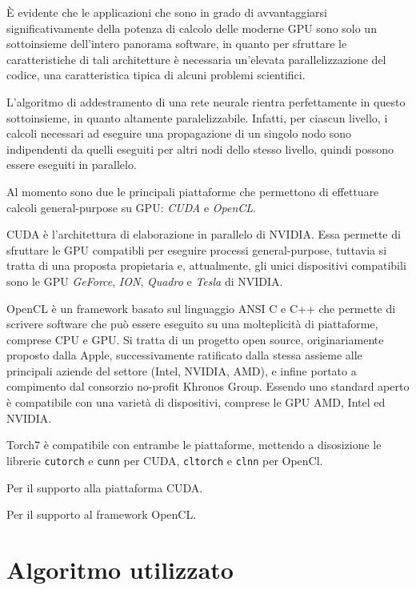\`E evidente che le applicazioni che sono in grado di avvantaggiarsi significativamente della potenza di calcolo delle moderne GPU sono solo un sottoinsieme dell'intero panorama software, in quanto per sfruttare le caratteristiche di tali architetture \`e necessaria un'elevata parallelizzazione del codice, una caratteristica tipica di alcuni problemi scientifici.

L'algoritmo di addestramento di una rete neurale rientra perfettamente in questo sottoinsieme, in quanto altamente paralelizzabile.
Infatti, per ciascun livello, i calcoli necessari ad eseguire una propagazione di un singolo nodo sono indipendenti da quelli eseguiti per altri nodi dello stesso livello, quindi possono essere eseguiti in parallelo.

Al momento sono due le principali piattaforme che permettono di effettuare calcoli general-purpose su GPU: \emph{CUDA} e \emph{OpenCL}.

CUDA \`e l'architettura di elaborazione in parallelo di NVIDIA.
Essa permette di sfruttare le GPU compatibli per eseguire processi general-purpose, tuttavia si tratta di una proposta propietaria e, attualmente, gli unici dispositivi compatibili sono le GPU \emph{GeForce}, \emph{ION}, \emph{Quadro} e \emph{Tesla} di NVIDIA.

OpenCL \`e un framework basato sul linguaggio ANSI C e C++ che permette di scrivere software che pu\`o essere eseguito su una molteplicit\`a di piattaforme, comprese CPU e GPU.
Si tratta di un progetto open source, originariamente proposto dalla Apple, successivamente ratificato dalla stessa assieme alle principali aziende del settore (Intel, NVIDIA, AMD), e infine portato a compimento dal consorzio no-profit Khronos Group.
Essendo uno standard aperto \`e compatibile con una variet\`a di dispositivi, comprese le GPU AMD, Intel ed NVIDIA.

Torch7 \`e compatibile con entrambe le piattaforme, mettendo a disosizione le librerie \texttt{cutorch} e \texttt{cunn} per CUDA, \texttt{cltorch} e \texttt{clnn} per OpenCl.



Per il supporto alla piattaforma CUDA.



Per il supporto al framework OpenCL.

\section{Algoritmo utilizzato}

